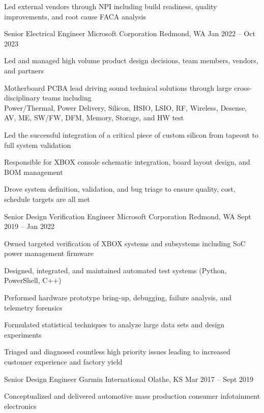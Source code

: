 \documentclass[]{awesome-cv}
\begin{document}
\begin{cventries}
{\begin{cvitems}
  \item {Led external vendors through NPI including build readiness, quality improvements, and root cause FACA analysis}
	\end{cvitems}}
	\cventry
	{Senior Electrical Engineer}
	{Microsoft Corporation}
	{Redmond, WA}
	{Jan 2022 – Oct 2023}
	{\begin{cvitems}
 	\item {Led and managed high volume product design decisions, team members, vendors, and partners}
		\item {Motherboard PCBA lead driving sound technical solutions through large cross-disciplinary teams including \\ 
  			Power/Thermal, Power Delivery, Silicon, HSIO, LSIO, RF, Wireless, Desense, AV, ME, SW/FW, DFM, Memory, Storage, and HW test}
		\item {Led the successful integration of a critical piece of custom silicon from tapeout to full system validation}
		\item {Responsible for XBOX console schematic integration, board layout design, and BOM management}
		\item {Drove system definition, validation, and bug triage to ensure quality, cost, schedule targets are all met}
	\end{cvitems}}
	\cventry
	{Senior Design Verification Engineer}
	{Microsoft Corporation}
	{Redmond, WA}
	{Sept 2019 – Jan 2022}
	{\begin{cvitems}
		\item {Owned targeted verification of XBOX systems and subsystems including SoC power management firmware}
		\item {Designed, integrated, and maintained automated test systems (Python, PowerShell, C++)}
		\item {Performed hardware prototype bring-up, debugging, failure analysis, and telemetry forensics}
		\item {Formulated statistical techniques to analyze large data sets and design experiments}
		\item {Triaged and diagnosed countless high priority issues leading to increased customer experience and factory yield}
	\end{cvitems}}
	\cventry
	{Senior Design Engineer}
	{Garmin International}
	{Olathe, KS}
	{Mar 2017 – Sept 2019}
	{\begin{cvitems}
		\item {Conceptualized and delivered automotive mass production consumer infotainment electronics}

\end{cvitems}}
\end{cventries}
\end{document}
